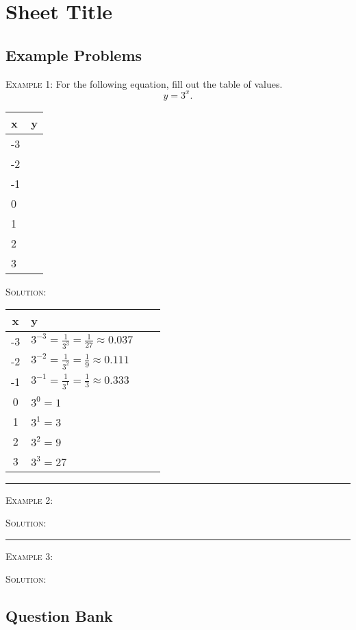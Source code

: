 \documentclass[a4paper,12pt]{article}
\begin{document}
\section*{Sheet Title}

\subsection*{Example Problems}

\textsc{Example 1}: For the following equation, fill out 
the table of values.
$$y = 3^x.$$
\begin{tabular}{|l|l|}
\hline
x & y \\
\hline
-3 & \\
\hline
-2 & \\
\hline
-1 & \\
\hline
0 & \\
\hline
1 & \\
\hline
2 & \\
\hline
3 & \\
\hline
\end{tabular}

\textsc{Solution}: 

\begin{tabular}{|Sl|Sl|}
\hline
x & y \\
 & $3^{-3} = \frac{1}{3^3} = \frac{1}{27} \approx 0.037$ \\
 & $3^{-2} = \frac{1}{3^2} = \frac{1}{9} \approx 0.111$ \\
 & $3^{-1} = \frac{1}{3^1} = \frac{1}{3} \approx 0.333$ \\
 & $3^0 = 1$ \\
 & $3^1 = 3$ \\
 & $3^2 = 9$ \\
 & $3^3 = 27$ \\
\hline
\end{tabular}
\vspace{3mm}
\hrule
\vspace{3mm}

\textsc{Example 2}: 

\textsc{Solution}: 

\vspace{3mm}
\hrule
\vspace{3mm}

\textsc{Example 3}: 

\textsc{Solution}: 

\newpage
\subsection*{Question Bank}
\end{document}
